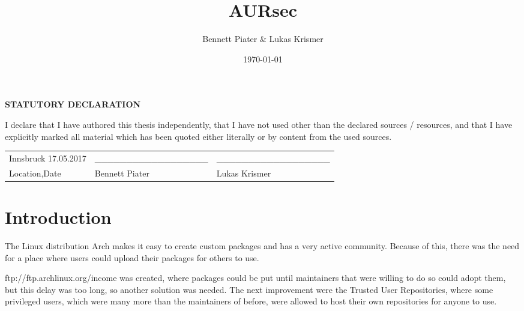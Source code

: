\documentclass{scrartcl}
\title{AURsec}
\author{Bennett Piater \& Lukas Krismer}
\date{\today}
\begin{document}
  \thispagestyle{empty}

  


  \vspace*{\fill}
  \begin{center} \textbf{\large{STATUTORY DECLARATION}} \end{center}
  I declare that I have authored this thesis independently, that I have not used other than the declared sources  /  resources,  and  that  I  have  explicitly  marked  all  material  which  has  been  quoted  either literally or by content from the used sources.

  \begin{center}
  \begin{table}[!htb]
  \begin{tabularx}{\textwidth}{lXX}
  Innsbruck 17.05.2017 & \_\_\_\_\_\_\_\_\_\_\_\_\_\_\_\_\_\_ & \_\_\_\_\_\_\_\_\_\_\_\_\_\_\_\_\_\_ \\
  Location,Date & Bennett Piater & Lukas Krismer \\

  \end{tabularx}
  \end{table}
  \end{center}
  \vspace*{\fill}
  \pagebreak


  \begin{abstract}
  \end{abstract}

  \tableofcontents
  \listoffigures
  \listoftables
  \pagebreak



  \section{Introduction}  %
  The Linux distribution Arch makes it easy to create custom packages and has a very active community. Because of this, there was the need for a place where users could upload their packages for others to use.

  ftp://ftp.archlinux.org/income was created, where packages could be put until maintainers that were willing to do so could adopt them, but this delay was too long, so another solution was needed.
  The next improvement were the Trusted User Repositories, where some privileged users, which were many more than the maintainers of before, were allowed to host their own repositories for anyone to use.
\end{document}
